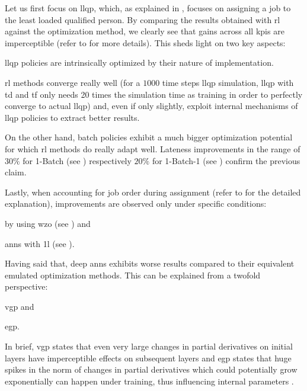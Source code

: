 \documentclass{seal_thesis}
\begin{document}
Let us first focus on \gls{llqp}, which, as explained in , focuses on assigning a job to the least loaded qualified person. By comparing the results obtained with \gls{rl} against the optimization method, we clearly see that gains across all \glspl{kpi} are imperceptible (refer to  for more details). This sheds light on two key aspects:
\begin{enumerate*}
	\item \gls{llqp} policies are intrinsically optimized by their nature of implementation.
	\item \gls{rl} methods converge really well (for a $1000$ time steps \gls{llqp} simulation, \gls{llqp} with \gls{td} and \gls{tf} only needs 20 times the simulation time as training in order to perfectly converge to actual \gls{llqp}) and, even if only slightly, exploit internal mechanisms of \gls{llqp} policies to extract better results.
\end{enumerate*}

On the other hand, batch policies exhibit a much bigger optimization potential for which \gls{rl} methods do really adapt well. Lateness improvements in the range of $30\%$ for 1-Batch (see ) respectively $20\%$ for 1-Batch-1 (see ) confirm the previous claim.

Lastly, when accounting for job order during assignment (refer to  for the detailed explanation), improvements are observed only under specific conditions:
\begin{enumerate*}
	\item by using \gls{wzo} (see ) and 
	\item \glspl{ann} with \gls{1l} (see ).
\end{enumerate*}

Having said that, deep \glspl{ann} exhibits worse results compared to their equivalent emulated optimization methods. This can be explained from a twofold perspective:
\begin{enumerate*}
	\item \gls{vgp} and
	\item \gls{egp}.
\end{enumerate*}

In brief, \gls{vgp} states that even very large changes in partial derivatives on initial layers have imperceptible effects on subsequent layers \cite{Bengio1994} and \gls{egp} states that huge spikes in the norm of changes in partial derivatives which could potentially grow exponentially can happen under training, thus influencing internal parameters \cite{Bengio1994,Pascanu2012}.
\end{document}
